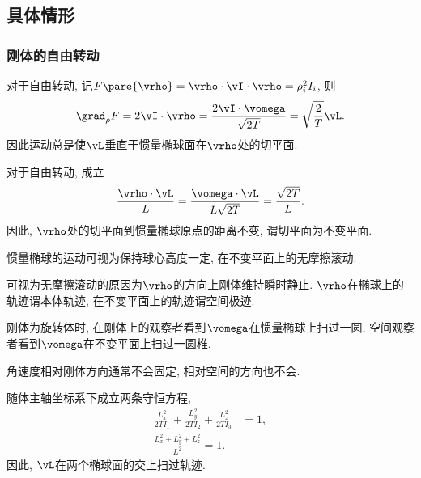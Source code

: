 \documentclass[../TheoreticalMechanics.tex]{subfiles}
\begin{document}


\subsection{具体情形} %
\label{sub:具体情形}

\subsubsection{刚体的自由转动} %
\label{ssub:刚体的自由转动}

\begin{lemma}[惯量椭球的转动]
    对于自由转动, 记$F\pare{\vrho} = \vrho\cdot\vI\cdot\vrho = \rho_i^2I_i$, 则
    \[ \grad_\rho F = 2\vI\cdot\vrho = \frac{2\vI\cdot\vomega}{\sqrt{2T}} = \sqrt{\frac{2}{T}}\vL. \]
    因此运动总是使$\vL$垂直于惯量椭球面在$\vrho$处的切平面.
\end{lemma}
\begin{lemma}[惯量椭球的切平面]
    对于自由转动, 成立
    \[ \frac{\vrho\cdot\vL}{L} = \frac{\vomega\cdot\vL}{L\sqrt{2T}} = \frac{\sqrt{2T}}{L}. \]
    因此, $\vrho$处的切平面到惯量椭球原点的距离不变, 谓切平面为不变平面.
\end{lemma}
\begin{finale}
    \begin{lemma}[惯量椭球的运动]
        惯量椭球的运动可视为保持球心高度一定, 在不变平面上的无摩擦滚动.
    \end{lemma}
\end{finale}
\begin{remark}
    可视为无摩擦滚动的原因为$\vrho$的方向上刚体维持瞬时静止. $\vrho$在椭球上的轨迹谓本体轨迹, 在不变平面上的轨迹谓空间极迹.
\end{remark}
\begin{ex}
    刚体为旋转体时, 在刚体上的观察者看到$\vomega$在惯量椭球上扫过一圆, 空间观察者看到$\vomega$在不变平面上扫过一圆椎.
\end{ex}
\begin{pitfall}
    角速度相对刚体方向通常不会固定, 相对空间的方向也不会.
\end{pitfall}
\begin{theorem}[角动量的轨迹]
    随体主轴坐标系下成立两条守恒方程,
    \begin{align*}
        \frac{L_x^2}{2TI_1} + \frac{L_y^2}{2TI_2} + \frac{L_z^2}{2TI_3} &= 1, \\
        \frac{L_x^2 + L_y^2 + L_z^2}{L^2} = 1.
    \end{align*}
    因此, $\vL$在两个椭球面的交上扫过轨迹.
\end{theorem}
\end{document}
